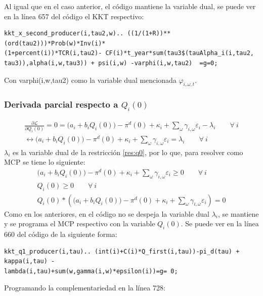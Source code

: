 Al igual que en el caso anterior, el código mantiene la variable dual, se puede ver en la línea 657 del código el KKT respectivo:

\begin{verbatim}
kkt_x_second_producer(i,tau2,w).. ((1/(1+R))**(ord(tau2)))*Prob(w)*Inv(i)*
(1+percent(i))*TCR(i,tau2)- CF(i)*t_year*sum(tau3$(tauAlpha_i(i,tau2,
tau3)),alpha(i,w,tau3)) + psi(i,w) -varphi(i,w,tau2)  =g=0;
\end{verbatim}

Con varphi(i,w,tau2) como la variable dual mencionada $\varphi_{i,\omega,t}$. 


\subsubsection{Derivada parcial respecto a $Q_i(0)$}
\footnotesize{
\begin{align}
    \frac{\partial \mathcal{L} }{\partial Q_i(0)}= 0 =  \big(a_{i}+b_i Q_{i}(0)\big)-\pi^d(0) + \kappa_i  + \sum_{\omega} \gamma_{i,\omega}\varepsilon_i-\lambda_i \qquad \forall \  i  \\
     \leftrightarrow \big(a_{i}+b_i Q_{i}(0)\big)-\pi^d(0) + \kappa_i  + \sum_{\omega} \gamma_{i,\omega}\varepsilon_i = \lambda_i \qquad \forall \  i
\end{align}
}
$\lambda_i$ es la variable dual de la restricción \ref{res:q0}, por lo que, para resolver como MCP se tiene lo siguiente:
\footnotesize{
\begin{align}
    \big(a_{i}+b_i Q_{i}(0)\big)-\pi^d(0) + \kappa_i  + \sum_{\omega} \gamma_{i,\omega}\varepsilon_i \geq 0 \qquad \forall \  i  \\
    Q_i(0) \geq 0 \qquad \forall \  i  \\
    Q_i(0)*( \big(a_{i}+b_i Q_{i}(0)\big)-\pi^d(0) + \kappa_i  + \sum_{\omega} \gamma_{i,\omega}\varepsilon_i)=0 
\end{align}
}
Como en los anteriores, en el código no se despeja la variable dual $\lambda_i$, se mantiene y se programa el MCP respectivo con la variable $Q_i(0)$. Se puede ver en la línea 660 del código de la siguiente forma:

\begin{verbatim}
kkt_q1_producer(i,tau).. (int(i)+C(i)*Q_first(i,tau))-pi_d(tau) + kappa(i,tau) - 
lambda(i,tau)+sum(w,gamma(i,w)*epsilon(i))=g= 0;
\end{verbatim}

Programando la complementariedad en la línea 728:

